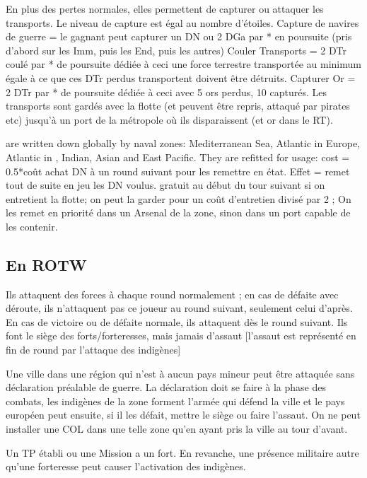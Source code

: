  En plus des pertes normales, elles permettent
de capturer ou attaquer les transports. Le niveau de capture est égal
au nombre d'étoiles. 
\bparag Capture de navires de guerre = le gagnant peut capturer un DN ou
2 DGa par * en poursuite        (pris d'abord sur les Imm, puis les End, puis les autres)
\bparag Couler Transports = 2 DTr coulé par * de poursuite dédiée à ceci
       une force terrestre transportée au minimum égale à ce que
       ces DTr perdus transportent doivent être détruits.
\bparag Capturer Or = 2 DTr par * de poursuite dédiée à ceci avec 5 ors perdus, 10 \ducats capturés.
Les transports sont gardés avec la flotte (et peuvent être repris, attaqué par pirates etc)
jusqu'à un port de la métropole où ils disparaissent (et or dans le RT).

  \ND are written down globally by naval zones:
Mediterranean Sea, Atlantic in Europe, Atlantic in \ROTW, Indian, Asian and East Pacific.
They are refitted for usage:
\bparag cost = 0.5*coût achat DN à un round suivant pour les remettre en état.
               Effet = remet tout de suite en jeu les DN voulus.
\bparag gratuit au début du tour suivant si on entretient la flotte;
\bparag on peut la garder  pour un coût d'entretien divisé par 2 ;
\bparag On les remet en priorité dans un Arsenal de la zone, sinon dans un
port capable de les contenir.

\subsection{En ROTW}

Ils attaquent des forces à chaque round normalement ; en cas
de défaite avec déroute, ils n'attaquent pas ce joueur au
round suivant, seulement celui d'après. En cas de victoire
ou de défaite normale, ils attaquent dès le round suivant.
Ils font le siège des forts/forteresses, mais jamais d'assaut
[l'assaut est représenté en fin de round par l'attaque des indigènes]

\aparag Une ville dans une région qui n'est à aucun pays mineur peut
être attaquée sans déclaration préalable de guerre. La déclaration
doit se faire à la phase des combats, les indigènes de la zone 
forment l'armée qui défend la ville et le pays européen peut
ensuite, si il les défait, mettre le siège ou faire l'assaut.
On ne peut installer une COL dans une telle zone qu'en ayant
pris la ville au tour d'avant.

\aparag Un TP établi ou une Mission a un fort. En revanche, une présence militaire
autre qu'une forteresse peut causer l'activation des indigènes.

